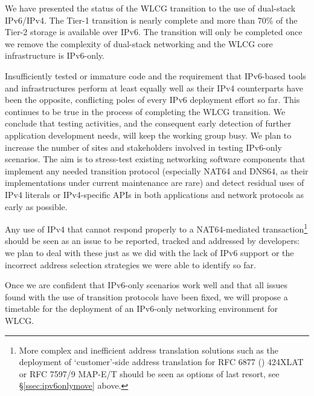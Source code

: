 
We have presented the status of the WLCG transition to the use of dual-stack IPv6/IPv4. The Tier-1 transition is nearly complete and 
more than 70\% of the Tier-2 storage is available over IPv6. The transition will only be completed once we remove the complexity of
dual-stack networking and the WLCG core infrastructure is IPv6-only.


Insufficiently tested or immature code and the requirement that IPv6-based
tools and infrastructures perform at least equally well as their IPv4
counterparts have been the opposite, conflicting poles of every IPv6
deployment effort so far. This continues to be true in the process
of completing the WLCG transition. We conclude that
testing activities, and the consequent early detection of further application
development needs, will keep the working group busy. We plan
to increase the number of sites and stakeholders involved in testing IPv6-only 
scenarios. The aim is to stress-test existing networking software components
that implement any needed transition protocol (especially NAT64 and DNS64, as 
their implementations under current maintenance are rare) and detect
residual uses of IPv4 literals or IPv4-specific APIs in both applications and
network protocols as early as possible.\par
Any use of IPv4 that cannot respond properly to a NAT64-mediated
transaction\footnote{More complex and inefficient address
translation solutions such as the deployment of `customer'-side address
translation for RFC 6877 (\cite{rfc}) 424XLAT or RFC 7597/9 MAP-E/T  should be
seen as options of last resort, see \S \ref{ssec:ipv6onlymove} above.}
should be seen as an issue to be reported, tracked and
addressed by developers: we plan to deal with these just as we did
with the lack of IPv6 support or the incorrect address selection
strategies we were able to identify so far.\par
Once we are confident that IPv6-only scenarios work well and that
all issues found with the use of transition protocols have been fixed, we will
propose a timetable for the deployment of an IPv6-only networking 
environment for WLCG.
